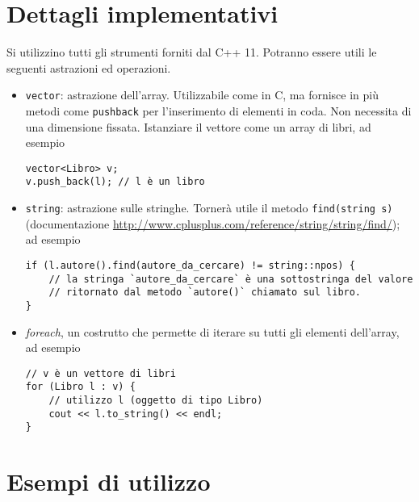 \documentclass[addpoints,12pt,answers]{exam}
\begin{document}
    \section{Dettagli implementativi}
    Si utilizzino tutti gli strumenti forniti dal C++ 11. Potranno essere utili le seguenti astrazioni ed operazioni.
    \begin{itemize}
    	\item \texttt{vector}: astrazione dell'array. Utilizzabile come in C, ma fornisce in più metodi come \texttt{push\textunderscore back} per l'inserimento di elementi in coda. Non necessita di una dimensione fissata. Istanziare il vettore come un array di libri, ad esempio
\begin{verbatim}
vector<Libro> v;
v.push_back(l); // l è un libro
\end{verbatim}

		\item \texttt{string}: astrazione sulle stringhe. Tornerà utile il metodo \texttt{find(string s)} (documentazione \href{http://www.cplusplus.com/reference/string/string/find/}{http://www.cplusplus.com/reference/string/string/find/}); ad esempio
\begin{verbatim}
if (l.autore().find(autore_da_cercare) != string::npos) {
    // la stringa `autore_da_cercare` è una sottostringa del valore
    // ritornato dal metodo `autore()` chiamato sul libro.
}
\end{verbatim}

		\item \emph{foreach}, un costrutto che permette di iterare su tutti gli elementi dell'array, ad esempio
\begin{verbatim}
// v è un vettore di libri
for (Libro l : v) {
    // utilizzo l (oggetto di tipo Libro)
    cout << l.to_string() << endl;
}
\end{verbatim}
    \end{itemize}
    
    
    \section{Esempi di utilizzo}
    
\end{document}
